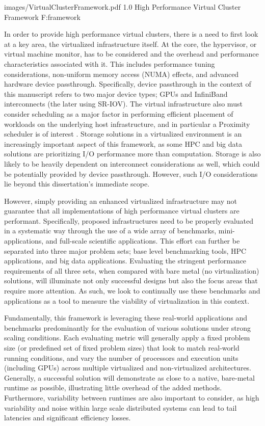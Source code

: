   {images/VirtualClusterFramework.pdf}
  {1.0}
  {High Performance Virtual Cluster Framework}
  {F:framework}

In order to provide high performance virtual clusters, there is a need to first look at a key area, the virtualized infrastructure itself. At the core, the hypervisor, or virtual machine monitor, has to be considered and the overhead and performance characteristics associated with it. This includes performance tuning considerations, non-uniform memory access (NUMA) effects, and advanced hardware device passthrough. Specifically, device passthrough in the context of this manuscript refers to two major device types; GPUs and InfiniBand interconnects (the later using SR-IOV). The virtual infrastructure also must consider scheduling as a major factor in performing efficient placement of workloads on the underlying host infrastructure, and in particular a Proximity scheduler is of interest \cite{www-proximity-scheduler}. Storage solutions in a virtualized environment is an increasingly important aspect of this framework, as some HPC and big data solutions are prioritizing I/O performance more than computation. Storage is also likely to be heavily dependent on interconnect considerations as well, which could be potentially provided by device passthrough. However, such I/O considerations lie beyond this dissertation's immediate scope.  


However, simply providing an enhanced virtualized infrastructure may not guarantee that all implementations of high performance virtual clusters are performant. Specifically, proposed infrastructures need to be properly evaluated in a systematic way through the use of a wide array of benchmarks, mini-applications, and full-scale scientific applications. This effort can further be separated into three major problem sets; base level benchmarking tools, HPC applications, and big data applications. Evaluating the stringent performance requirements of all three sets, when compared with bare metal (no virtualization) solutions, will illuminate not only successful designs but also the focus areas that require more attention.  As such, we look to continually use these benchmarks and applications as a tool to measure the viability of virtualization in this context. 

Fundamentally, this framework is leveraging these real-world applications and benchmarks predominantly for the evaluation of various solutions under strong scaling conditions. Each evaluating metric will generally apply a fixed problem size (or predefined set of fixed problem sizes) that look to match real-world running conditions, and vary the number of processors and execution units (including GPUs) across multiple virtualized and non-virtualized architectures.  Generally, a successful solution will demonstrate as close to a native, bare-metal runtime as possible, illustrating little overhead of the added methods. Furthermore, variability between runtimes are also important to consider, as high variability and noise within large scale distributed systems can lead to tail latencies and significant efficiency losses.

